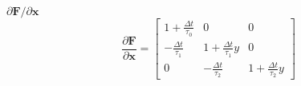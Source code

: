 \vspace{-0.15in}
\begin{block}{$\partial \mathbf{F} / \partial \mathbf{x}$}
\begin{equation*}
\frac{\partial \mathbf{F}}{\partial \mathbf{x}} = \begin{bmatrix}
1 + \frac{\Delta t}{\tau_0} & 0 & 0 \\[0.3cm]
-\frac{\Delta t}{\tau_1} & 1 + \frac{\Delta t}{\tau_1} y & 0 \\[0.3cm]
0 & -\frac{\Delta t}{\tau_2} & 1 + \frac{\Delta t}{\tau_2} y
\end{bmatrix}
\end{equation*}
\end{block}
